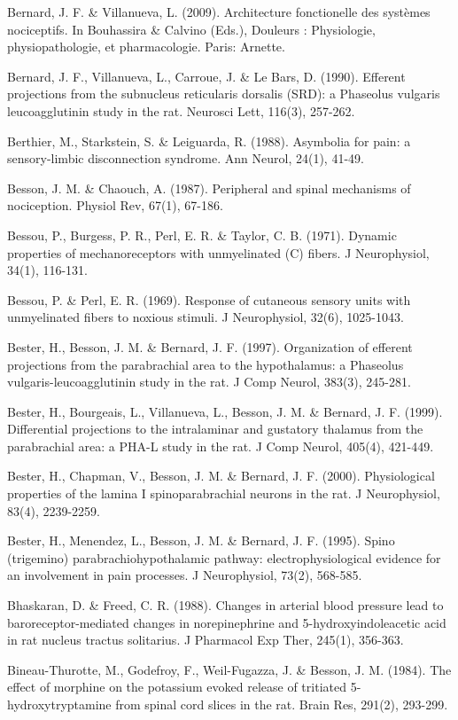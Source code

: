 \documentclass[a4paper,12pt,twoside]{report}
\begin{document}
\begin{singlespacing}
\begin{footnotesize}
Bernard, J. F. \& Villanueva, L. (2009). Architecture fonctionelle des systèmes nociceptifs. In Bouhassira \& Calvino (Eds.), Douleurs : Physiologie, physiopathologie, et pharmacologie. Paris: Arnette.

Bernard, J. F., Villanueva, L., Carroue, J. \& Le Bars, D. (1990). Efferent projections from the subnucleus reticularis dorsalis (SRD): a Phaseolus vulgaris leucoagglutinin study in the rat. Neurosci Lett, 116(3), 257-262.

Berthier, M., Starkstein, S. \& Leiguarda, R. (1988). Asymbolia for pain: a sensory-limbic disconnection syndrome. Ann Neurol, 24(1), 41-49.

Besson, J. M. \& Chaouch, A. (1987). Peripheral and spinal mechanisms of nociception. Physiol Rev, 67(1), 67-186.

Bessou, P., Burgess, P. R., Perl, E. R. \& Taylor, C. B. (1971). Dynamic properties of mechanoreceptors with unmyelinated (C) fibers. J Neurophysiol, 34(1), 116-131.

Bessou, P. \& Perl, E. R. (1969). Response of cutaneous sensory units with unmyelinated fibers to noxious stimuli. J Neurophysiol, 32(6), 1025-1043.

Bester, H., Besson, J. M. \& Bernard, J. F. (1997). Organization of efferent projections from the parabrachial area to the hypothalamus: a Phaseolus vulgaris-\linebreak leucoagglutinin study in the rat. J Comp Neurol, 383(3), 245-281.

Bester, H., Bourgeais, L., Villanueva, L., Besson, J. M. \& Bernard, J. F. (1999). Differential projections to the intralaminar and gustatory thalamus from the parabrachial area: a PHA-L study in the rat. J Comp Neurol, 405(4), 421-449.

Bester, H., Chapman, V., Besson, J. M. \& Bernard, J. F. (2000). Physiological properties of the lamina I spinoparabrachial neurons in the rat. J Neurophysiol, 83(4), 2239-2259.

Bester, H., Menendez, L., Besson, J. M. \& Bernard, J. F. (1995). Spino (trigemino) parabrachiohypothalamic pathway: electrophysiological evidence for an involvement in pain processes. J Neurophysiol, 73(2), 568-585.

Bhaskaran, D. \& Freed, C. R. (1988). Changes in arterial blood pressure lead to baroreceptor-mediated changes in norepinephrine and 5-hydroxyindoleacetic acid in rat nucleus tractus solitarius. J Pharmacol Exp Ther, 245(1), 356-363.

Bineau-Thurotte, M., Godefroy, F., Weil-Fugazza, J. \& Besson, J. M. (1984). The effect of morphine on the potassium evoked release of tritiated 5-hydroxytryptamine from spinal cord slices in the rat. Brain Res, 291(2), 293-299.


\end{footnotesize}
\end{singlespacing}
\end{document}
